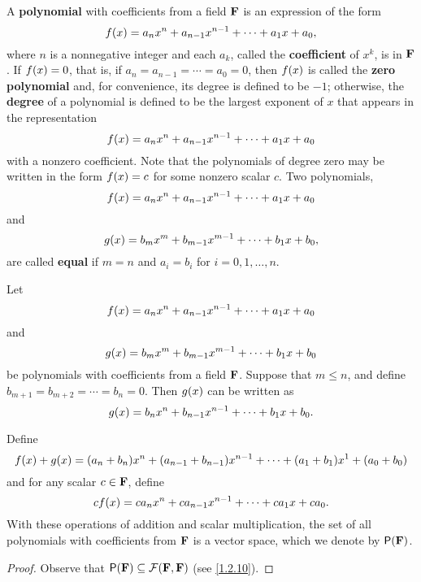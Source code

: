 \begin{defn}\label{1.2.11}
    A \textbf{polynomial} with coefficients from a field \(\mathbf{F}\) is an expression of the form
    \[
        f\p{x} = a_{n} x^{n} + a_{n - 1} x^{n - 1} + \cdots + a_{1} x + a_{0},
    \]
    where \(n\) is a nonnegative integer and each \(a_{k}\), called the \textbf{coefficient} of \(x^{k}\), is in \(\mathbf{F}\).
    If \(f\p{x} = 0\), that is, if \(a_{n} = a_{n - 1} = \cdots = a_{0} = 0\), then \(f\p{x}\) is called the \textbf{zero polynomial} and, for convenience, its degree is defined to be \(-1\);
    otherwise, the \textbf{degree} of a polynomial is defined to be the largest exponent of \(x\) that appears in the representation
    \[
        f\p{x} = a_{n} x^{n} + a_{n - 1} x^{n - 1} + \cdots + a_{1} x + a_{0}
    \]
    with a nonzero coefficient.
    Note that the polynomials of degree zero may be written in the form \(f\p{x} = c\) for some nonzero scalar \(c\).
    Two polynomials,
    \[
        f\p{x} = a_{n} x^{n} + a_{n - 1} x^{n - 1} + \cdots + a_{1} x + a_{0}
    \]
    and
    \[
        g\p{x} = b_{m} x^{m} + b_{m - 1} x^{m - 1} + \cdots + b_{1} x + b_{0},
    \]
    are called \textbf{equal} if \(m = n\) and \(a_i = b_i\) for \(i = 0, 1, \dots, n\).
\end{defn}

\begin{eg}\label{1.2.12}
    Let
    \[
        f\p{x} = a_{n} x^{n} + a_{n - 1} x^{n - 1} + \cdots + a_{1} x + a_{0}
    \]
    and
    \[
        g\p{x} = b_{m} x^{m} + b_{m - 1} x^{m - 1} + \cdots + b_{1} x + b_{0}
    \]
    be polynomials with coefficients from a field \(\mathbf{F}\).
    Suppose that \(m \leq n\), and define \(b_{m + 1} = b_{m + 2} = \cdots = b_{n} = 0\).
    Then \(g\p{x}\) can be written as
    \[
        g\p{x} = b_{n} x^{n} + b_{n - 1} x^{n - 1} + \cdots + b_{1} x + b_{0}.
    \]

    Define
    \[
        f\p{x} + g\p{x} = \p{a_{n} + b_{n}} x^{n} + \p{a_{n - 1} + b_{n - 1}} x^{n - 1} + \cdots + \p{a_{1} + b_{1}} x^{1} + \p{a_{0} + b_{0}}
    \]
    and for any scalar \(c \in \mathbf{F}\), define
    \[
        cf\p{x} = ca_{n} x^{n} + ca_{n - 1} x^{n - 1} + \cdots + ca_{1} x + ca_{0}.
    \]
    With these operations of addition and scalar multiplication, the set of all polynomials with coefficients from \(\mathbf{F}\) is a vector space, which we denote by \(\ps{\F}\).
\end{eg}

\begin{proof}
    Observe that \(\ps{\F} \subseteq \fs{\F}{\F}\) (see \cref{1.2.10}).
\end{proof}

